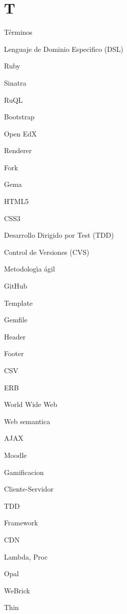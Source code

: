 \section{T}
\label{Apendice1:T}

T\'erminos
\bigskip

Lenguaje de Dominio Espec\'{\i}fico (DSL)
\bigskip

Ruby
\bigskip

Sinatra
\bigskip

RuQL
\bigskip

Bootstrap
\bigskip

Open EdX
\bigskip

Renderer
\bigskip

Fork
\bigskip

Gema
\bigskip

HTML5
\bigskip

CSS3
\bigskip

Desarrollo Dirigido por Test (TDD)
\bigskip

Control de Versiones (CVS)
\bigskip

Metodolog\'{\i}a \'agil
\bigskip

GitHub
\bigskip

Template
\bigskip

Gemfile
\bigskip

Header
\bigskip

Footer
\bigskip

CSV
\bigskip

ERB
\bigskip

World Wide Web
\bigskip

Web semantica
\bigskip

AJAX
\bigskip

Moodle
\bigskip

Gamificacion
\bigskip

Cliente-Servidor
\bigskip

TDD
\bigskip

Framework
\bigskip

CDN
\bigskip

Lambda, Proc
\bigskip

Opal
\bigskip

WeBrick
\bigskip

Thin
\bigskip